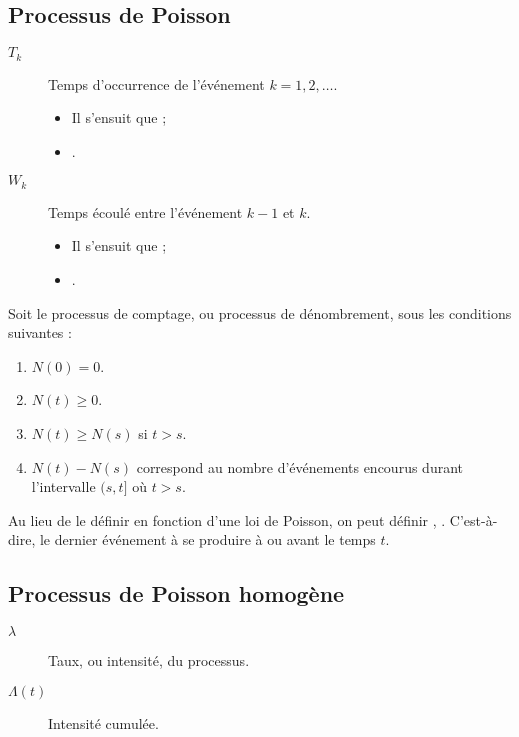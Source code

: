 \documentclass[10pt, french]{article}
\begin{document}
\begin{multicols*}{2}
\section{Processus de Poisson}
\begin{distributions}[Notation]
\begin{description}
	\item[$T_{k}$]	Temps d'occurrence de l'événement $k	=	1, 2, \dots$.
		\begin{itemize}
		\item	Il s'ensuit que  ;
		\item	{}.
		\end{itemize}
	\item[$W_{k}$]	Temps écoulé entre l'événement $k - 1$ et $k$.
		\begin{itemize}
		\item	Il s'ensuit que  ;
		\item	{}.
		\end{itemize}
\end{description}
\end{distributions}

\begin{definitionNOHFILL}
Soit le processus de comptage, ou processus de dénombrement,  sous les conditions suivantes :
\begin{enumerate}[label = \circled{\arabic*}{trueblue}]
	\item	$N(0)	=	0$.
	\item	$N(t)	\geq	0$.
	\item	$N(t)	\geq	N(s)$ si $t	>	s$.
	\item	$N(t) - N(s)$ correspond au nombre d'événements encourus durant l'intervalle $(s, t]$ où $t	>	s$.
\end{enumerate}

\bigskip

Au lieu de le définir en fonction d'une loi de Poisson, on peut définir , . C'est-à-dire, le dernier événement à se produire à ou avant le temps $t$.
\end{definitionNOHFILL}


\columnbreak
\subsection{Processus de Poisson homogène}
\begin{distributions}[Notation]
\begin{description}
	\item[$\lambda$]	Taux, ou intensité, du processus.
	\item[$\Lambda(t)$]	Intensité cumulée.
\end{description}
\end{distributions}


\end{multicols*}
\end{document}
